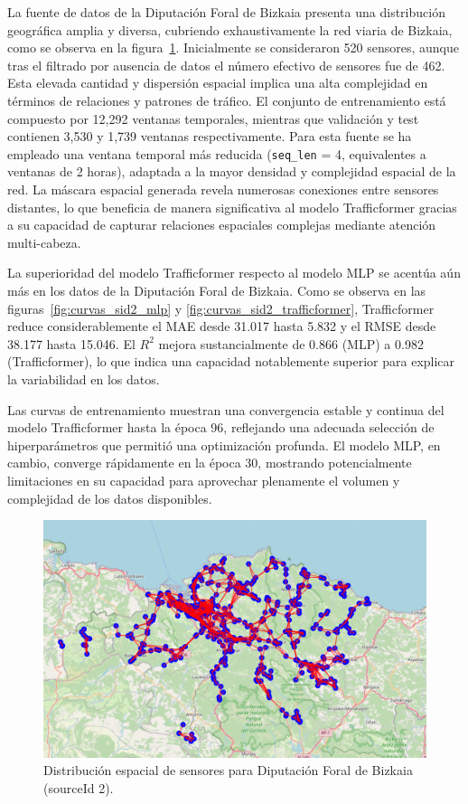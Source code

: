 La fuente de datos de la Diputación Foral de Bizkaia presenta una distribución geográfica amplia y diversa, cubriendo exhaustivamente la red viaria de Bizkaia, como se observa en la figura~\ref{fig:sensores_sid2}. Inicialmente se consideraron 520 sensores, aunque tras el filtrado por ausencia de datos el número efectivo de sensores fue de 462. Esta elevada cantidad y dispersión espacial implica una alta complejidad en términos de relaciones y patrones de tráfico. El conjunto de entrenamiento está compuesto por 12,292 ventanas temporales, mientras que validación y test contienen 3,530 y 1,739 ventanas respectivamente. Para esta fuente se ha empleado una ventana temporal más reducida (\texttt{seq\_len} = 4, equivalentes a ventanas de 2 horas), adaptada a la mayor densidad y complejidad espacial de la red. La máscara espacial generada revela numerosas conexiones entre sensores distantes, lo que beneficia de manera significativa al modelo Trafficformer gracias a su capacidad de capturar relaciones espaciales complejas mediante atención multi-cabeza.

La superioridad del modelo Trafficformer respecto al modelo MLP se acentúa aún más en los datos de la Diputación Foral de Bizkaia. Como se observa en las figuras~\ref{fig:curvas_sid2_mlp} y \ref{fig:curvas_sid2_trafficformer}, Trafficformer reduce considerablemente el MAE desde 31.017 hasta 5.832 y el RMSE desde 38.177 hasta 15.046. El $R^2$ mejora sustancialmente de 0.866 (MLP) a 0.982 (Trafficformer), lo que indica una capacidad notablemente superior para explicar la variabilidad en los datos.

Las curvas de entrenamiento muestran una convergencia estable y continua del modelo Trafficformer hasta la época 96, reflejando una adecuada selección de hiperparámetros que permitió una optimización profunda. El modelo MLP, en cambio, converge rápidamente en la época 30, mostrando potencialmente limitaciones en su capacidad para aprovechar plenamente el volumen y complejidad de los datos disponibles.

\begin{figure}[H]
	\centering
	\includegraphics[width=0.7\linewidth]{includes/cap5/source_id_2_meters_mask.png}
	\caption{Distribución espacial de sensores para Diputación Foral de Bizkaia (sourceId 2).}
	\label{fig:sensores_sid2}
\end{figure}

